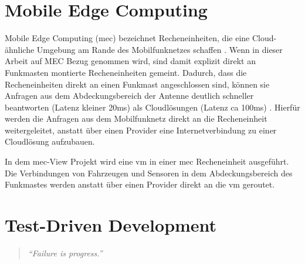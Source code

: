 \section{Mobile Edge Computing}


Mobile Edge Computing (\gls{mec}) bezeichnet Recheneinheiten, die eine Cloud-ähnliche Umgebung am Rande des Mobilfunknetzes schaffen \cite[4]{etsi:mec}.
Wenn in dieser Arbeit auf MEC Bezug genommen wird, sind damit explizit direkt an Funkmasten montierte Recheneinheiten gemeint.
Dadurch, dass die Recheneinheiten direkt an einen Funkmast angeschlossen sind, können sie Anfragen aus dem Abdeckungsbereich der Antenne deutlich schneller beantworten (Latenz kleiner 20ms) als Cloudlösungen (Latenz ca 100ms) \cite[2]{perf:mec:fraunhofer}.
Hierfür werden die Anfragen aus dem Mobilfunknetz direkt an die Recheneinheit weitergeleitet, anstatt über einen Provider eine Internetverbindung zu einer Cloudlösung aufzubauen.

In dem \gls{mec}-View Projekt wird eine \gls{vm} in einer \gls{mec} Recheneinheit ausgeführt.
Die Verbindungen von Fahrzeugen und Sensoren in dem Abdeckungsbereich des Funkmastes werden anstatt über einen Provider direkt an die \gls{vm} geroutet.



		


	
\section{Test-Driven Development}
\label{tdd}

\begin{quotation}
	\textit{\enquote{Failure is progress.}}
	\cite[5]{tdd}
\end{quotation}

